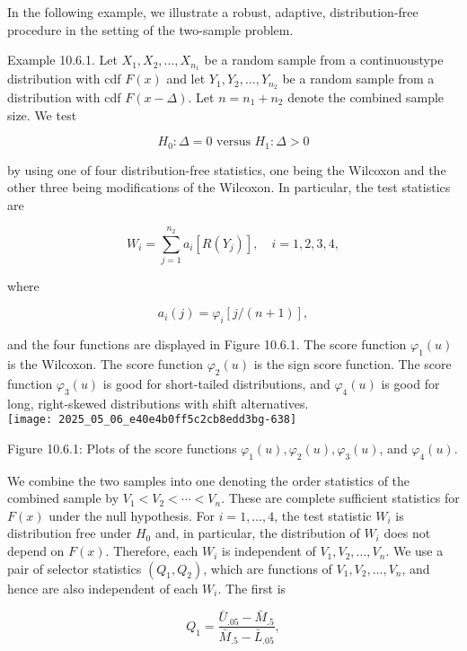 In the following example, we illustrate a robust, adaptive, distribution-free procedure in the setting of the two-sample problem.

Example 10.6.1. Let $X_{1}, X_{2}, \ldots, X_{n_{1}}$ be a random sample from a continuoustype distribution with cdf $F(x)$ and let $Y_{1}, Y_{2}, \ldots, Y_{n_{2}}$ be a random sample from a distribution with cdf $F(x-\Delta)$. Let $n=n_{1}+n_{2}$ denote the combined sample size. We test

$$
H_{0}: \Delta=0 \text { versus } H_{1}: \Delta>0
$$

by using one of four distribution-free statistics, one being the Wilcoxon and the other three being modifications of the Wilcoxon. In particular, the test statistics\\
are


\begin{equation*}
W_{i}=\sum_{j=1}^{n_{2}} a_{i}\left[R\left(Y_{j}\right)\right], \quad i=1,2,3,4, \tag{10.6.1}
\end{equation*}


where

$$
a_{i}(j)=\varphi_{i}[j /(n+1)],
$$

and the four functions are displayed in Figure 10.6.1. The score function $\varphi_{1}(u)$ is the Wilcoxon. The score function $\varphi_{2}(u)$ is the sign score function. The score function $\varphi_{3}(u)$ is good for short-tailed distributions, and $\varphi_{4}(u)$ is good for long, right-skewed distributions with shift alternatives.\\
\texttt{[image: 2025\_05\_06\_e40e4b0ff5c2cb8edd3bg-638]}

Figure 10.6.1: Plots of the score functions $\varphi_{1}(u), \varphi_{2}(u), \varphi_{3}(u)$, and $\varphi_{4}(u)$.

We combine the two samples into one denoting the order statistics of the combined sample by $V_{1}<V_{2}<\cdots<V_{n}$. These are complete sufficient statistics for $F(x)$ under the null hypothesis. For $i=1, \ldots, 4$, the test statistic $W_{i}$ is distribution free under $H_{0}$ and, in particular, the distribution of $W_{i}$ does not depend on $F(x)$. Therefore, each $W_{i}$ is independent of $V_{1}, V_{2}, \ldots, V_{n}$. We use a pair of selector statistics $\left(Q_{1}, Q_{2}\right)$, which are functions of $V_{1}, V_{2}, \ldots, V_{n}$, and hence are also independent of each $W_{i}$. The first is


\begin{equation*}
Q_{1}=\frac{\bar{U}_{.05}-\bar{M}_{.5}}{\bar{M}_{.5}-\bar{L}_{.05}}, \tag{10.6.2}
\end{equation*}


